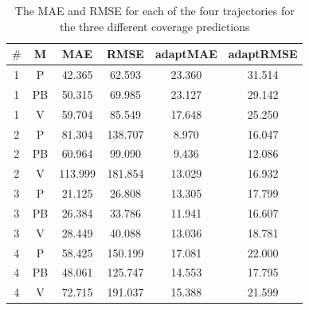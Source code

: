 \documentclass[twocolumn]{bmcart}%
\begin{document}
\begin{backmatter}
\begin{table}[h]
\caption{The MAE and RMSE for each of the four trajectories for the three different coverage predictions}
\begin{tabular}{|c|c|c|c|c|c|}
\hline
\textbf{$\#$} & \textbf{M}& \textbf{MAE} & \textbf{RMSE}      & \textbf{adaptMAE} & \textbf{adaptRMSE}          \\ \hline
1 & P   & 42.365& 62.593 & 23.360 & 31.514 \\  \hline %
1&  PB   & 50.315 & 69.985 & 23.127 &  29.142  \\  \hline  %
1 &  V  & 59.704& 85.549  & 17.648 & 25.250 \\  \hline%
2 & P   & 81.304 & 138.707 & 8.970 & 16.047\\ \hline %
2&  PB   & 60.964 & 99.090 & 9.436 & 12.086    \\   \hline%
2 &  V  & 113.999 & 181.854 & 13.029 & 16.932   \\  \hline %
3 & P   & 21.125 & 26.808 & 13.305 & 17.799   \\   \hline%
3&  PB   & 26.384& 33.786& 11.941 & 16.607   \\   \hline%
3 &  V  & 28.449& 40.088 & 13.036 & 18.781   \\  \hline%
4 & P   & 58.425 & 150.199 & 17.081 & 22.000 \\  \hline%
4&  PB   & 48.061 & 125.747&  14.553  &  17.795  \\   \hline%
4 &  V  & 72.715& 191.037 &  15.388 &  21.599 \\  \hline %
\end{tabular}
\label{table:results}
\end{table}


%


\end{backmatter}
\end{document}
